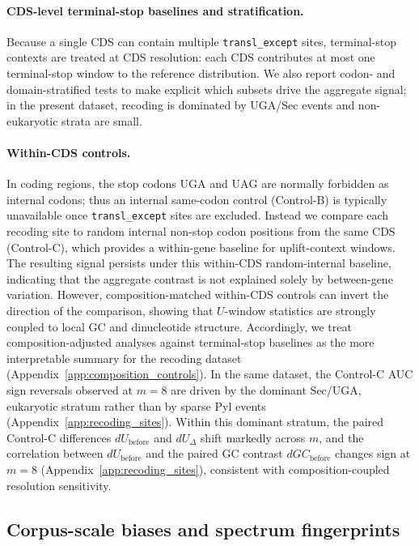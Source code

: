 \paragraph{CDS-level terminal-stop baselines and stratification.}
Because a single CDS can contain multiple \texttt{transl\_except} sites, terminal-stop contexts are treated at CDS resolution: each CDS contributes at most one terminal-stop window to the reference distribution.
We also report codon- and domain-stratified tests to make explicit which subsets drive the aggregate signal; in the present dataset, recoding is dominated by $\mathrm{UGA}$/Sec events and non-eukaryotic strata are small.

\paragraph{Within-CDS controls.}
In coding regions, the stop codons $\mathrm{UGA}$ and $\mathrm{UAG}$ are normally forbidden as internal codons; thus an internal same-codon control (Control-B) is typically unavailable once \texttt{transl\_except} sites are excluded.
Instead we compare each recoding site to random internal non-stop codon positions from the same CDS (Control-C), which provides a within-gene baseline for uplift-context windows.
The resulting signal persists under this within-CDS random-internal baseline, indicating that the aggregate contrast is not explained solely by between-gene variation.
However, composition-matched within-CDS controls can invert the direction of the comparison, showing that $U$-window statistics are strongly coupled to local GC and dinucleotide structure.
Accordingly, we treat composition-adjusted analyses against terminal-stop baselines as the more interpretable summary for the recoding dataset (Appendix~\ref{app:composition_controls}).
In the same dataset, the Control-C AUC sign reversals observed at $m=8$ are driven by the dominant Sec/UGA, eukaryotic stratum rather than by sparse Pyl events (Appendix~\ref{app:recoding_sites}).
Within this dominant stratum, the paired Control-C differences $dU_{\mathrm{before}}$ and $dU_{\Delta}$ shift markedly across $m$, and the correlation between $dU_{\mathrm{before}}$ and the paired GC contrast $dGC_{\mathrm{before}}$ changes sign at $m=8$ (Appendix~\ref{app:recoding_sites}), consistent with composition-coupled resolution sensitivity.

\subsection{Corpus-scale biases and spectrum fingerprints}
\label{sec:corpus_biases}

